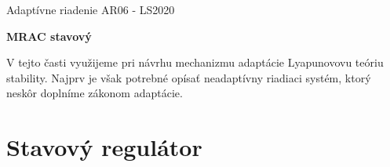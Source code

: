 \documentclass[a4paper, 10pt, ]{article}
\def\oznacenieCasti{AR06 - LS2020}
\begin{document}
\fontsize{12pt}{22pt}\selectfont

\centerline{\textsf{Adaptívne riadenie} \hfill \textsf{\oznacenieCasti}}

\fontsize{18pt}{22pt}\selectfont





\begin{flushleft}
    \textbf{\textsf{MRAC stavový}}
\end{flushleft}





\normalsize

\bigskip

\tableofcontents

\bigskip

\vspace{18pt}






\noindent
V tejto časti využijeme pri návrhu mechanizmu adaptácie Lyapunovovu teóriu stability. Najprv je však potrebné opísať neadaptívny riadiaci systém, ktorý neskôr doplníme zákonom adaptácie.











\section{Stavový regulátor}
\label{Stavový regulátor ($n=2$)}
\end{document}
